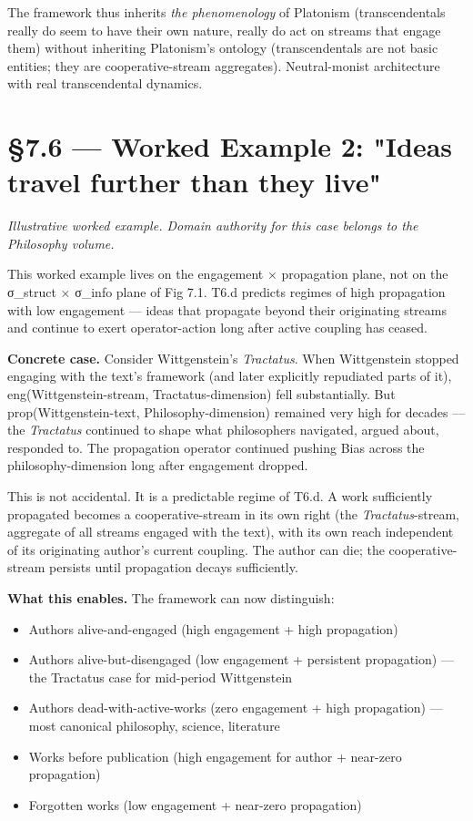 \documentclass[11pt, openany]{book}
\newcommand{\sectionbreak}{\clearpage}
\begin{document}
The framework thus inherits \textit{the phenomenology} of Platonism (transcendentals really do seem to have their own nature, really do act on streams that engage them) without inheriting Platonism's ontology (transcendentals are not basic entities; they are cooperative-stream aggregates). Neutral-monist architecture with real transcendental dynamics.

\sectionbreak

\section{§7.6 --- Worked Example 2: "Ideas travel further than they live"}

\textit{Illustrative worked example. Domain authority for this case belongs to the Philosophy volume.}

This worked example lives on the engagement × propagation plane, not on the σ\_\allowbreak{}struct × σ\_\allowbreak{}info plane of Fig 7.1. T6.d predicts regimes of high propagation with low engagement --- ideas that propagate beyond their originating streams and continue to exert operator-action long after active coupling has ceased.

\textbf{Concrete case.} Consider Wittgenstein's \textit{Tractatus}. When Wittgenstein stopped engaging with the text's framework (and later explicitly repudiated parts of it), eng(Wittgenstein-stream, Tractatus-dimension) fell substantially. But prop(Wittgenstein-text, Philosophy-dimension) remained very high for decades --- the \textit{Tractatus} continued to shape what philosophers navigated, argued about, responded to. The propagation operator continued pushing Bias across the philosophy-dimension long after engagement dropped.

This is not accidental. It is a predictable regime of T6.d. A work sufficiently propagated becomes a cooperative-stream in its own right (the \textit{Tractatus}-stream, aggregate of all streams engaged with the text), with its own reach independent of its originating author's current coupling. The author can die; the cooperative-stream persists until propagation decays sufficiently.

\textbf{What this enables.} The framework can now distinguish:
\begin{itemize}
\item Authors alive-and-engaged (high engagement + high propagation)
\item Authors alive-but-disengaged (low engagement + persistent propagation) --- the Tractatus case for mid-period Wittgenstein
\item Authors dead-with-active-works (zero engagement + high propagation) --- most canonical philosophy, science, literature
\item Works before publication (high engagement for author + near-zero propagation)
\item Forgotten works (low engagement + near-zero propagation)
\end{itemize}
\end{document}
